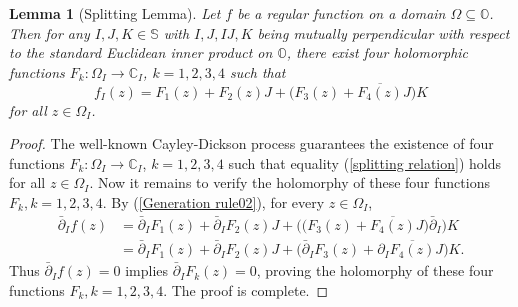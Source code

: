 \documentclass{amsart}
\newtheorem{lemma}[theorem]{Lemma}
\theoremstyle{definition}
\theoremstyle{remark}
\numberwithin{equation}{section}
\begin{document}
\begin{lemma}[Splitting Lemma]\label{eq:Splitting}
Let $f$ be a regular function on a  domain $\Omega\subseteq \mathbb O$. Then for any $I, J, K\in\mathbb S$ with  $I, J, IJ, K$ being mutually perpendicular with respect to the standard Euclidean inner product on $\mathbb O$, there exist four holomorphic functions $F_k: \Omega_I\rightarrow\mathbb C_I$, $k=1,2,3,4$ such that
\begin{equation}\label{splitting relation}
f_I(z)=F_1(z)+F_2(z)J+\big(F_3(z)+\overline{F_4(z)}J\big)K
\end{equation}
for all $z\in\Omega_I$.
\end{lemma}

\begin{proof}
The well-known Cayley-Dickson process guarantees the existence of four functions $F_k: \Omega_I\rightarrow\mathbb C_I$, $k=1,2,3,4$ such that  equality (\ref{splitting relation}) holds for all $z\in\Omega_I$. Now it remains to verify the holomorphy of these four functions $F_k, k=1,2,3,4$. By (\ref{Generation rule02}), for every $z\in\Omega_I$,
\begin{equation}\label{holomorphy-verification}
\begin{split}
\bar{\partial}_I f(z)
&=\bar{\partial}_IF_1(z)+\bar{\partial}_IF_2(z)J
+\Big(\big(F_3(z)+\overline{F_4(z)}J \big)\bar{\partial}_{I }\Big)K
\\
&=\bar{\partial}_IF_1(z)+\bar{\partial}_IF_2(z)J
+\big(\bar{\partial}_IF_3(z)+\partial_I\overline{F_4(z)}J\big)K.
\end{split}
\end{equation}
Thus $\bar{\partial}_I f(z)=0$ implies $\bar{\partial}_IF_k(z)=0$, proving the holomorphy of these four functions $F_k, k=1,2,3,4$. The proof is complete.
\end{proof}
\end{document}
